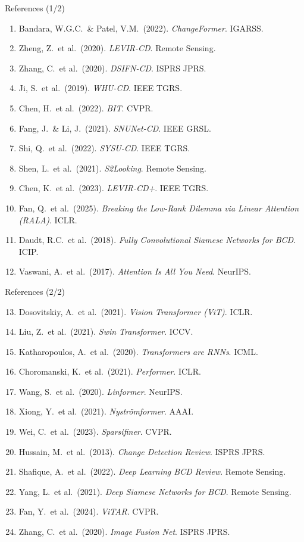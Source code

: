 \documentclass[aspectratio=169]{beamer}
\begin{document}
\begin{frame}{References (1/2)}
\footnotesize
\begin{enumerate}
\item Bandara, W.G.C.\ \& Patel, V.M.\ (2022). \textit{ChangeFormer}. IGARSS.
\item Zheng, Z.\ et al.\ (2020). \textit{LEVIR-CD}. Remote Sensing.
\item Zhang, C.\ et al.\ (2020). \textit{DSIFN-CD}. ISPRS JPRS.
\item Ji, S.\ et al.\ (2019). \textit{WHU-CD}. IEEE TGRS.
\item Chen, H.\ et al.\ (2022). \textit{BIT}. CVPR.
\item Fang, J.\ \& Li, J.\ (2021). \textit{SNUNet-CD}. IEEE GRSL.
\item Shi, Q.\ et al.\ (2022). \textit{SYSU-CD}. IEEE TGRS.
\item Shen, L.\ et al.\ (2021). \textit{S2Looking}. Remote Sensing.
\item Chen, K.\ et al.\ (2023). \textit{LEVIR-CD+}. IEEE TGRS.
\item Fan, Q.\ et al.\ (2025). \textit{Breaking the Low-Rank Dilemma via Linear Attention (RALA)}. ICLR.
\item Daudt, R.C.\ et al.\ (2018). \textit{Fully Convolutional Siamese Networks for BCD}. ICIP.
\item Vaswani, A.\ et al.\ (2017). \textit{Attention Is All You Need}. NeurIPS.
\end{enumerate}
\end{frame}

\begin{frame}{References (2/2)}
\footnotesize
\begin{enumerate}
\setcounter{enumi}{12}
\item Dosovitskiy, A.\ et al.\ (2021). \textit{Vision Transformer (ViT)}. ICLR.
\item Liu, Z.\ et al.\ (2021). \textit{Swin Transformer}. ICCV.
\item Katharopoulos, A.\ et al.\ (2020). \textit{Transformers are RNNs}. ICML.
\item Choromanski, K.\ et al.\ (2021). \textit{Performer}. ICLR.
\item Wang, S.\ et al.\ (2020). \textit{Linformer}. NeurIPS.
\item Xiong, Y.\ et al.\ (2021). \textit{Nyströmformer}. AAAI.
\item Wei, C.\ et al.\ (2023). \textit{Sparsifiner}. CVPR.
\item Hussain, M.\ et al.\ (2013). \textit{Change Detection Review}. ISPRS JPRS.
\item Shafique, A.\ et al.\ (2022). \textit{Deep Learning BCD Review}. Remote Sensing.
\item Yang, L.\ et al.\ (2021). \textit{Deep Siamese Networks for BCD}. Remote Sensing.
\item Fan, Y.\ et al.\ (2024). \textit{ViTAR}. CVPR.
\item Zhang, C.\ et al.\ (2020). \textit{Image Fusion Net}. ISPRS JPRS.
\end{enumerate}
\end{frame}
\end{document}
